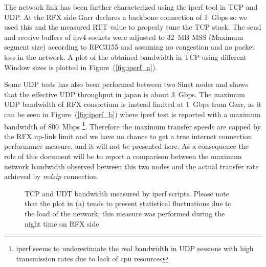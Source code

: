 \documentclass[10pt,a4paper]{article}
\begin{document}
The network link has been further characterized using the iperf tool in TCP and UDP. 
At the RFX side Garr declares a backbone connection of 1~Gbps so we used this and the measured RTT value to properly tune the TCP stack.
The send and receive buffers of ipv4 sockets were adjusted to 32~MB MSS (Maximum segment size) according to RFC3155 and assuming no congestion and no packet loss in the network.
A plot of the obtained bandwidth in TCP using different Window sizes is plotted in Figure~(\ref{fig:iperf_a}).

Some UDP tests has also been performed between two Sinet nodes and shows that the effective UDP throughput in japan is about 3~Gbps.
The maximum UDP bandwidth of RFX consortium is instead limited at 1~Gbps from Garr, as it can be seen in Figure~(\ref{fig:iperf_b}) where iperf test is reported with a maximum bandwidth of 800~Mbps
\footnote{iperf seems to underestimate the real bandwidth in UDP sessions with high transmission rates due to lack of cpu resources}.
Therefore the maximum transfer speeds are capped by the RFX up-link limit and we have no chance to get a true internet connection performance measure, and it will not be presented here.
As a consequence the role of this document will be to report a comparison between the maximum network bandwidth observed between this two nodes and the actual transfer rate achieved by \emph{mdsip} connection.

\begin{figure}[htbp!]
\centerline{
}
\caption[]
{ TCP and UDT bandwidth measured by iperf scripts. Please note that the plot in (a) tends to present statistical fluctuations due to the load of the network,
this measure was performed during the night time on RFX side. }
\label{fig:iprf}
\end{figure}
\end{document}
